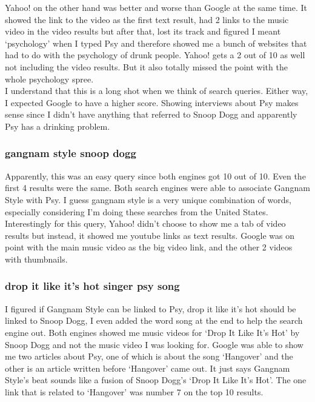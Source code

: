 \documentclass[10pt,letterpaper,bibliography=totoc]{scrartcl}
\begin{document}
Yahoo! on the other hand was better and worse than Google at the same time. It showed the link to the video as the first text result, had 2 links to the music video in the video results but after that, lost its track and figured I meant `psychology' when I typed Psy and therefore showed me a bunch of websites that had to do with the psychology of drunk people. Yahoo! gets a 2 out of 10 as well not including the video results. But it also totally missed the point with the whole psychology spree. \\

I understand that this is a long shot when we think of search queries. Either way, I expected Google to have a higher score. Showing interviews about Psy makes sense since I didn't have anything that referred to Snoop Dogg and apparently Psy has a drinking problem. 

\subsubsection{gangnam style snoop dogg}
Apparently, this was an easy query since both engines got 10 out of 10. Even the first 4 results were the same. Both search engines were able to associate Gangnam Style with Psy. I guess gangnam style is a very unique combination of words, especially considering I'm doing these searches from the United States. \\

Interestingly for this query, Yahoo! didn't choose to show me a tab of video results but instead, it showed me youtube links as text results. Google was on point with the main music video as the big video link, and the other 2 videos with thumbnails. 

\subsubsection{drop it like it's hot singer psy song}
I figured if Gangnam Style can be linked to Psy, drop it like it's hot should be linked to Snoop Dogg, I even added the word song at the end to help the search engine out. Both engines showed me music videos for `Drop It Like It's Hot' by Snoop Dogg and not the music video I was looking for. Google was able to show me two articles about Psy, one of which is about the song `Hangover' and the other is an article written before `Hangover' came out. It just says Gangnam Style's beat sounds like a fusion of Snoop Dogg's `Drop It Like It's Hot'. The one link that is related to `Hangover' was number 7 on the top 10 results.\\
\end{document}
